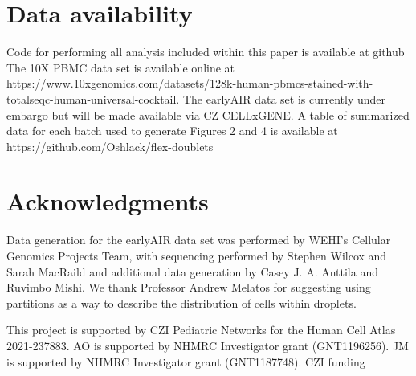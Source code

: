 \documentclass[unnumsec,webpdf,modern,large]{oup-authoring-template}
\begin{document}
	
	
	\section{Data availability}
	\label{sec:data availability}
	
	Code for performing all analysis included within this paper is available at github
	The 10X PBMC data set is available online at https://www.10xgenomics.com/datasets/128k-human-pbmcs-stained-with-totalseqc-human-universal-cocktail. 
	The earlyAIR data set is currently under embargo but will be made available via CZ CELLxGENE. A table of summarized data for each batch used to generate Figures 2 and 4 is available at https://github.com/Oshlack/flex-doublets
	
	
	\section{Acknowledgments}
	\label{acknowledgements}
	
	Data generation for the earlyAIR data set was performed by WEHI’s Cellular Genomics Projects Team, with sequencing performed by Stephen Wilcox and Sarah MacRaild and additional data generation by Casey J. A. Anttila and Ruvimbo Mishi.
	We thank Professor Andrew Melatos for suggesting using partitions as a way to describe the distribution of cells within droplets. 
	
	This project is supported by CZI Pediatric Networks for the Human Cell Atlas 2021-237883.
	AO is supported by NHMRC Investigator grant (GNT1196256). 
	JM is supported by NHMRC Investigator grant (GNT1187748). CZI funding 
	
	
	
	 
	
	
	
	
	
\end{document}
